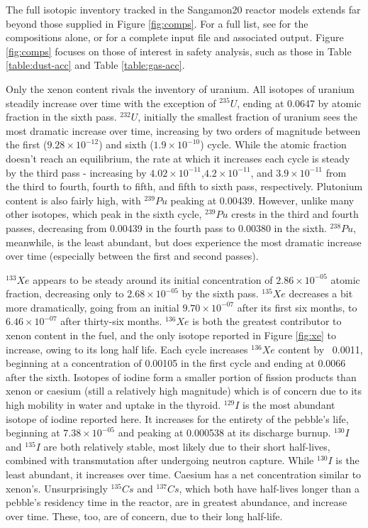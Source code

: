 

The full isotopic inventory tracked in the Sangamon20 reactor models extends far beyond those supplied in Figure \ref{fig:comps}.  For a full list, see \cite{richter_isotopic_2021} for the compositions alone, or \cite{richter_zoerichterphlox_2021} for a complete input file and associated output.  Figure \ref{fig:comps} focuses on those of interest in safety analysis, such as those in Table \ref{table:dust-acc} and Table \ref{table:gas-acc}.

Only the xenon content rivals the inventory of uranium.  All isotopes of uranium steadily increase over time with the exception of $^{235}U$, ending at 0.0647 by atomic fraction in the sixth pass.  $^{232}U$, initially the smallest fraction of uranium sees the most dramatic increase over time, increasing by two orders of magnitude between the first ($9.28\times10^{-12}$) and sixth ($1.9\times10^{-10}$) cycle.  While the atomic fraction doesn't reach an equilibrium, the rate at which it increases each cycle is steady by the third pass - increasing by $4.02\times10^{-11}$,$4.2\times10^{-11}$, and $3.9\times10^{-11}$ from the third to fourth, fourth to fifth, and fifth to sixth pass, respectively.  Plutonium content is also fairly high, with $^{239}Pu$ peaking at 0.00439.  However, unlike many other isotopes, which peak in the sixth cycle, $^{239}Pu$ crests in the third and fourth passes, decreasing from 0.00439 in the fourth pass to 0.00380 in the sixth.  $^{238}Pu$, meanwhile, is the least abundant, but does experience the most dramatic increase over time (especially between the first and second passes).



$^{133}Xe$ appears to be steady around its initial concentration of $2.86\times10^{-05}$ atomic fraction, decreasing only to $2.68\times10^{-05}$ by the sixth pass.  $^{135}Xe$ decreases a bit more dramatically, going from an initial $9.70\times10^{-07}$ after its first six months, to  $6.46\times10^{-07}$ after thirty-six months.  $^{136}Xe$ is both the greatest contributor to xenon content in the fuel, and the only isotope reported in  Figure \ref{fig:xe} to increase, owing to its long half life.  Each cycle increases $^{136}Xe$ content by ~0.0011, beginning at a concentration of 0.00105 in the first cycle and ending at 0.0066 after the sixth.  Isotopes of iodine form a smaller portion of fission products than xenon or caesium (still a relatively high magnitude) which is of concern due to its high mobility in water and uptake in the thyroid.  $^{129}I$ is the most abundant isotope of iodine reported here.  It increases for the entirety of the pebble's life, beginning at $7.38\times10^{-05}$ and peaking at 0.000538 at its discharge burnup.  $^{130}I$ and $^{135}I$ are both relatively stable, most likely due to their short half-lives, combined with transmutation after undergoing neutron capture.  While $^{130}I$ is the least abundant, it increases over time.  Caesium has a net concentration similar to xenon's.  Unsurprisingly $^{135}Cs$ and $^{137}Cs$, which both have half-lives longer than a pebble's residency time in the reactor, are in greatest abundance, and increase over time.  These, too, are of concern, due to their long half-life.

